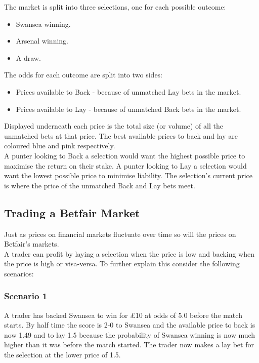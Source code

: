 The market is split into three selections, one for each possible outcome: 

	\begin{itemize}
		\item Swansea winning.
		\item Arsenal winning.
		\item A draw.
	\end{itemize}

The odds for each outcome are split into two sides:

	\begin{itemize}
		\item Prices available to Back - because of unmatched Lay bets in the market.
		\item Prices available to Lay - because of unmatched Back bets in the market.
	\end{itemize}		
		 
Displayed underneath each price is the total size (or volume) of all the unmatched bets at that price. The best available prices to back and lay are coloured blue and pink respectively.\\

A punter looking to Back a selection would want the highest possible price to maximise the return on their stake. A punter looking to Lay a selection would want the lowest possible price to minimise liability. The selection's current price is where the price of the unmatched Back and Lay bets meet.

	\subsection{Trading a Betfair Market}	
Just as prices on financial markets fluctuate over time so will the prices on Betfair's markets.\\

A trader can profit by laying a selection when the price is low and backing when the price is high or visa-versa. To further explain this consider the following scenarios: 

	\subsubsection{Scenario 1}
	A trader has backed Swansea to win for \pounds10 at odds of 5.0 before the match starts. By half time the score is 2-0 to Swansea and the available price to back is now 1.49 and to lay 1.5 because the probability of Swansea winning is now much higher than it was before the match started. The trader now makes a lay bet for the selection at the lower price of 1.5.

